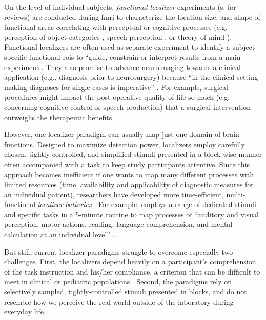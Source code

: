 
On the level of individual subjects, \textit{functional localizer} experiments
(s. \citep{saxe2006divide, friston2006critique} for reviews) are conducted
during \ac{fmri} to characterize the location size, and shape of functional
areas correlating with perceptual or cognitive processes (e.g. perception of
object categories \citep{kanwisher1997ffa}, speech perception
\citep{fernandez2001language}, or theory of mind \citep{spunt2014validating}).
Functional localizers are often used as separate experiment to identify a
subject-specific functional \acp{roi} to ``guide, constrain or interpret results
from a main experiment \citep{saxe2006divide}.
They also promise to advance neuroimaging towards a clinical application (e.g.,
diagnosis prior to neurosurgery) because ``in the clinical setting making
diagnoses for single cases is imperative'' \citep{wegrzyn2018thought}.
For example, surgical procedures might impact the post-operative quality of life
so much (e.g. concerning cognitive control or speech production) that a surgical
intervention outweighs the therapeutic benefits.

However, one localizer paradigm can usually map just one domain of brain
functions.
Designed to maximize detection power, localizers employ carefully chosen,
tightly-controlled, and simplified stimuli presented in a block-wise manner
often accompanied with a task to keep study participants attentive.
Since this approach becomes inefficient if one wants to map many different
processes with limited resources (time, availability and applicability of
diagnostic measures for an individual patient), researchers have developed more
time-efficient, multi-functional \textit{localizer batteries}
\citep{barch2013function, drobyshevsky2006rapid, pinho2018individual,
pinho2020individual, pinel2007fast}.
For example, \citet{pinel2007fast} employs a range of dedicated stimuli and
specific tasks in a 5-minute routine to map processes of ``auditory and visual
perception, motor actions, reading, language comprehension, and mental
calculation at an individual level'' \citep{pinel2007fast}.

But still, current localizer paradigms struggle to overcome especially two
challenges.
%
First, the localizers depend heavily on a participant's comprehension of the
task instruction and his/her compliance, a criterion that can be difficult to
meet in clinical or pediatric populations \citep{eickhoff2020towards,
vanderwal2015inscapes, vanderwal2019movies}.
Second, the paradigms rely on selectively sampled, tightly-controlled stimuli
presented in blocks, and do not resemble how we perceive the real world outside
of the laboratory during everyday life.


